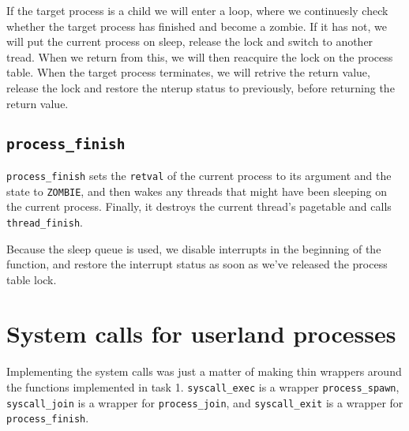 \documentclass{article}
\begin{document}
If the target process is a child we will enter a loop, where we
continuesly check whether the target process has finished and become a
zombie. If it has not, we will put the current process on sleep,
release the lock and switch to another tread. When we return from
this, we will then reacquire the lock on the process table. When the
target process terminates, we will retrive the return value, release
the lock and restore the nterup status to previously, before returning
the return value.

\subsection{\texttt{process\_finish}}

\texttt{process\_finish} sets the \texttt{retval} of the current process to its argument and the state to \texttt{ZOMBIE}, and then wakes any threads that might have been sleeping on the current process. Finally, it destroys the current thread's pagetable and calls \texttt{thread\_finish}.

Because the sleep queue is used, we disable interrupts in the beginning of the function, and restore the interrupt status as soon as we've released the process table lock.

\section{System calls for userland processes}
Implementing the system calls was just a matter of making thin wrappers around the functions implemented in task 1. \texttt{syscall\_exec} is a wrapper \texttt{process\_spawn}, \texttt{syscall\_join} is a wrapper for \texttt{process\_join}, and \texttt{syscall\_exit} is a wrapper for \texttt{process\_finish}.
\end{document}
